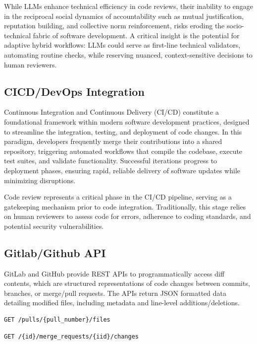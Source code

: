 \documentclass[12pt]{article}
\begin{document}
While LLMs enhance technical efficiency in code reviews, their inability to engage in the reciprocal social dynamics of accountability such as mutual justification, reputation building, and collective norm reinforcement, risks eroding the socio-technical fabric of software development. A critical insight is the potential for adaptive hybrid workflows: LLMs could serve as first-line technical validators, automating routine checks, while reserving nuanced, context-sensitive decisions  to human reviewers. \cite{accountability}

\subsection{CICD/DevOps Integration}
Continuous Integration and Continuous Delivery (CI/CD) constitute a foundational framework within modern software development practices, designed to streamline the integration, testing, and deployment of code changes. In this paradigm, developers frequently merge their contributions into a shared repository, triggering automated workflows that compile the codebase, execute test suites, and validate functionality. Successful iterations progress to deployment phases, ensuring rapid, reliable delivery of software updates while minimizing disruptions. \cite{AIDrivenDevops}

Code review represents a critical phase in the CI/CD pipeline, serving as a gatekeeping mechanism prior to code integration. Traditionally, this stage relies on human reviewers to assess code for errors, adherence to coding standards, and potential security vulnerabilities. \cite{aiDrivenAgile}

\subsection{Gitlab/Github API}
GitLab and GitHub provide REST APIs to programmatically access diff contents, which are structured representations of code changes between commits, branches, or merge/pull requests. The APIs return JSON formatted data detailing modified files, including metadata and line-level additions/deletions.


\lstset{basicstyle=\ttfamily, frame=single, language=JavaScript}
\begin{lstlisting}[caption={Github Patches API Endpoint}, label={lst:github-patches}]
GET /pulls/{pull_number}/files
\end{lstlisting}

\lstset{basicstyle=\ttfamily, frame=single, language=JavaScript}
\begin{lstlisting}[caption={Gitlab Diffs API Endpoint}, label={lst:gitlab-diffs}]
GET /{id}/merge_requests/{iid}/changes
\end{lstlisting}
\end{document}
